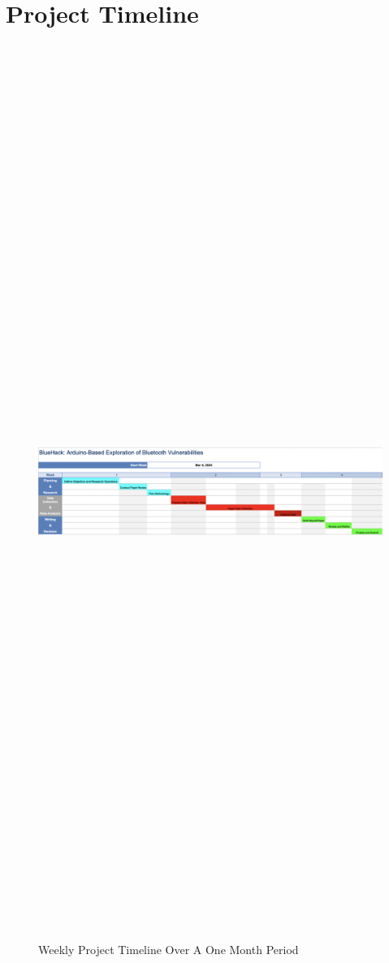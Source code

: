\documentclass{article}
\begin{document}
\section{Project Timeline}
    \begin{figure}[htp]
    \centering
    \includegraphics[width=12cm,height=30cm,keepaspectratio]{Project_Timeline.png}
    \caption{Weekly Project Timeline Over A One Month Period}
\end{figure}
\end{document}

